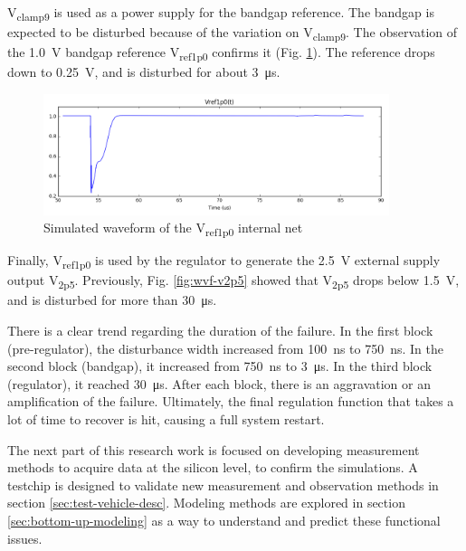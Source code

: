 V\textsubscript{clamp9} is used as a power supply for the bandgap reference.
The bandgap is expected to be disturbed because of the variation on V\textsubscript{clamp9}.
The observation of the \SI{1.0}{\volt} bandgap reference V\textsubscript{ref1p0} confirms it (Fig. \ref{fig:wvf-v1p0}).
The reference drops down to \SI{0.25}{\volt}, and is disturbed for about \SI{3}{\micro\second}.

\begin{figure}[!h]
  \centering
  \includegraphics[width=0.9\textwidth]{src/3/figures/v1p0.png}
  \caption{Simulated waveform of the V\textsubscript{ref1p0} internal net}
  \label{fig:wvf-v1p0}
\end{figure}

Finally, V\textsubscript{ref1p0} is used by the regulator to generate the \SI{2.5}{\volt} external supply output V\textsubscript{2p5}.
Previously,  Fig. \ref{fig:wvf-v2p5} showed that V\textsubscript{2p5} drops below \SI{1.5}{\volt}, and is disturbed for more than \SI{30}{\micro\second}.

There is a clear trend regarding the duration of the failure.
In the first block (pre-regulator), the disturbance width increased from \SI{100}{\nano\second} to \SI{750}{\nano\second}.
In the second block (bandgap), it increased from \SI{750}{\nano\second} to \SI{3}{\micro\second}.
In the third block (regulator), it reached \SI{30}{\micro\second}.
After each block, there is an aggravation or an amplification of the failure.
Ultimately, the final regulation function that takes a lot of time to recover is hit, causing a full system restart.

The next part of this research work is focused on developing measurement methods to acquire data at the silicon level, to confirm the simulations.
A testchip is designed to validate new measurement and observation methods in section \ref{sec:test-vehicle-desc}.
Modeling methods are explored in section \ref{sec:bottom-up-modeling} as a way to understand and predict these functional issues.
